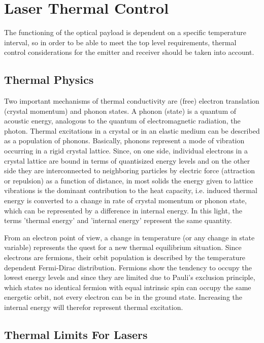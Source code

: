 \section{Laser Thermal Control}
	\label{mtLSRthermal}
The functioning of the optical payload is dependent on a specific temperature interval, so in order to be able to meet the top level requirements, thermal control considerations for the emitter and receiver should be taken into account. 

\subsection{Thermal Physics}
	\label{mtLSRthermalphysics}
Two important mechanisms of thermal conductivity are (free) electron translation (crystal momentum) and phonon states. A phonon (state) is a quantum of acoustic energy, analogous to the quantum of electromagnetic radiation, the photon. Thermal excitations in a crystal or in an elastic medium can be described as a population of phonons. Basically, phonons represent a mode of vibration occurring in a rigid crystal lattice. Since, on one side, individual electrons in a crystal lattice are bound in terms of quantisized energy levels and on the other side they are interconnected to neighboring particles by electric force (attraction or repulsion) as a function of distance, in most solids the energy given to lattice vibrations is the dominant contribution to the heat capacity, i.e. induced thermal energy is converted to a change in rate of crystal momentum or phonon state, which can be represented by a difference in internal energy. In this light, the terms 'thermal energy' and 'internal energy' represent the same quantity. 

From an electron point of view, a change in temperature (or any change in state variable) represents the quest for a new thermal equilibrium situation. Since electrons are fermions, their orbit population is described by the temperature dependent Fermi-Dirac distribution. Fermions show the tendency to occupy the lowest energy levels and since they are limited due to Pauli's exclusion principle, which states no identical fermion with equal intrinsic spin can occupy the same energetic orbit, not every electron can be in the ground state. Increasing the internal energy will therefor represent thermal excitation.  

\subsection{Thermal Limits For Lasers}
